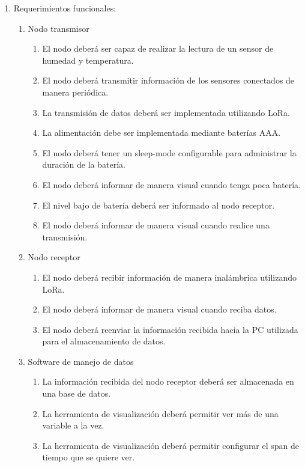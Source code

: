 \documentclass[11pt]{charter}
\begin{document}
\begin{enumerate}
\item Requerimientos funcionales:
	\begin{enumerate}
	\item Nodo transmisor
		\begin{enumerate}[label*=\arabic*.]
		\item El nodo deberá ser capaz de realizar la lectura de un sensor de humedad y temperatura.
		\item El nodo deberá transmitir información de los sensores conectados de manera periódica.
		\item La transmisión de datos deberá ser implementada utilizando LoRa.
		\item La alimentación debe ser implementada mediante baterías AAA.
		\item El nodo deberá tener un sleep-mode configurable para administrar la duración de la batería.
		\item El nodo deberá informar de manera visual cuando tenga poca batería.
		\item El nivel bajo de batería deberá ser informado al nodo receptor.
		\item El nodo deberá informar de manera visual cuando realice una transmisión.
		\end{enumerate}
	\item Nodo receptor
		\begin{enumerate}[label*=\arabic*.]
		\item El nodo deberá recibir información de manera inalámbrica utilizando LoRa.
		\item El nodo deberá informar de manera visual cuando reciba datos.
		\item El nodo deberá reenviar la información recibida hacia la PC utilizada para el almacenamiento de datos.
		\end{enumerate}
	\item Software de manejo de datos
		\begin{enumerate}[label*=\arabic*.]
		\item La información recibida del nodo receptor deberá ser almacenada en una base de datos.
		\item La herramienta de visualización deberá permitir ver más de una variable a la vez.
		\item La herramienta de visualización deberá permitir configurar el span de tiempo que se quiere ver.
		\end{enumerate}
	\end{enumerate}

\end{enumerate}
\end{document}
